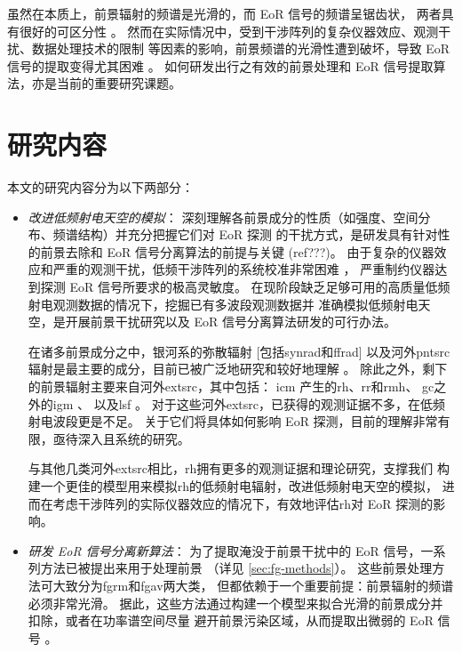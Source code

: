 虽然在本质上，前景辐射的频谱是光滑的，而 EoR 信号的频谱呈锯齿状，
两者具有很好的可区分性 \cite{wang2006,jelic2008,harker2009,wang2013}。
然而在实际情况中，受到干涉阵列的复杂仪器效应、观测干扰、数据处理技术的限制
等因素的影响，前景频谱的光滑性遭到破坏，导致 EoR 信号的提取变得尤其困难
\cite{liu2009ps,labropoulos2009,gehlot2018,mertens2018}。
如何研发出行之有效的前景处理和 EoR 信号提取算法，亦是当前的重要研究课题。


\section{研究内容}
\label{sec:content}

本文的研究内容分为以下两部分：
\begin{itemize}
\item
\emph{改进低频射电天空的模拟}：
深刻理解各前景成分的性质（如强度、空间分布、频谱结构）并充分把握它们对 EoR 探测
的干扰方式，是研发具有针对性的前景去除和 EoR 信号分离算法的前提与关键 (ref???)。
由于复杂的仪器效应和严重的观测干扰，低频干涉阵列的系统校准非常困难
\cite{noordam2004,intema2009,wijnholds2010,barry2016,gehlot2018}，
严重制约仪器达到探测 EoR 信号所要求的极高灵敏度。
在现阶段缺乏足够可用的高质量低频射电观测数据的情况下，挖掘已有多波段观测数据并
准确模拟低频射电天空，是开展前景干扰研究以及 EoR 信号分离算法研发的可行办法。

\hspace{2\ccwd}%
在诸多前景成分之中，银河系的弥散辐射 [包括\ac{synrad}和\ac{ffrad}]
以及河外\ac{pntsrc}辐射是最主要的成分，目前已被广泛地研究和较好地理解
\cite{shaver1999,diMatteo2004,gleser2008,liu2012,murray2017,spinelli2018}。
除此之外，剩下的前景辐射主要来自河外\ac{extsrc}，其中包括：
\ac{icm} \cite{feretti2012} 产生的\ac{rh}、\ac{rr}和\ac{rmh}、
\ac{gc}之外的\ac{igm} \cite{keshet2004}、
以及\ac{lsf} \cite{vazza2015}。
对于这些河外\acl{extsrc}，已获得的观测证据不多，在低频射电波段更是不足。
关于它们将具体如何影响 EoR 探测，目前的理解非常有限，亟待深入且系统的研究。

\hspace{2\ccwd}%
与其他几类河外\acl{extsrc}相比，\acl{rh}拥有更多的观测证据和理论研究，支撑我们
构建一个更佳的模型用来模拟\acl{rh}的低频射电辐射，改进低频射电天空的模拟，
进而在考虑干涉阵列的实际仪器效应的情况下，有效地评估\acl{rh}对 EoR 探测的影响。

\item
\emph{研发 EoR 信号分离新算法}：
为了提取淹没于前景干扰中的 EoR 信号，一系列方法已被提出来用于处理前景
（详见 \autoref{sec:fg-methods}）。
这些前景处理方法可大致分为\ac{fgrm}和\ac{fgav}两大类，
但都依赖于一个重要前提：前景辐射的频谱必须非常光滑。
据此，这些方法通过构建一个模型来拟合光滑的前景成分并扣除，或者在功率谱空间尽量
避开前景污染区域，从而提取出微弱的 EoR 信号 \cite{chapman2016}。


\end{itemize}
